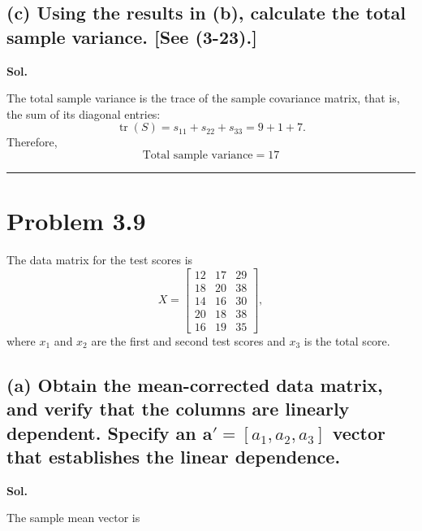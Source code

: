 \documentclass[12pt]{article}
\begin{document}
\vspace{0.2cm}

\subsection*{(c) Using the results in (b), calculate the total sample variance. [See (3-23).]}

\vspace{0.2cm}

\textbf{Sol.}

\vspace{0.2cm}

The total sample variance is the trace of the sample covariance matrix, that is, the sum of its diagonal entries:
\[
\operatorname{tr}(S)=s_{11}+s_{22}+s_{33}
=9+1+7.
\]
Therefore,
\[
\boxed{\text{Total sample variance}=17}
\]

\vspace{0.7cm}
\hrule
\vspace{0.7cm}

\section*{Problem 3.9}

The data matrix for the test scores is
\[
X=\begin{bmatrix}
12&17&29\\
18&20&38\\
14&16&30\\
20&18&38\\
16&19&35
\end{bmatrix},
\]
where $x_1$ and $x_2$ are the first and second test scores and $x_3$ is the total score.

\subsection*{(a) Obtain the mean-corrected data matrix, and verify that the columns are linearly dependent. Specify an $\boldsymbol{a}'=[a_1,a_2,a_3]$ vector that establishes the linear dependence.}

\vspace{0.2cm}

\textbf{Sol.}

\vspace{0.2cm}

The sample mean vector is

\vspace{0.2cm}
\end{document}
